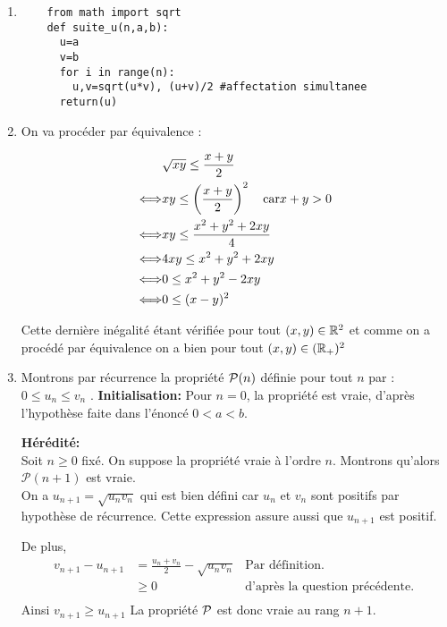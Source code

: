 \documentclass[a4paper, 11pt]{article}
\begin{document}
\begin{correction}
\begin{enumerate}
\item 
\begin{lstlisting}
    from math import sqrt
    def suite_u(n,a,b):
      u=a
      v=b
      for i in range(n):
        u,v=sqrt(u*v), (u+v)/2 #affectation simultanee
      return(u)    
\end{lstlisting}
\item On va procéder par équivalence : 

\begin{align*}
    &\sqrt{xy} \leq \frac{x+y}{2}\\
    \Longleftrightarrow & xy \leq \left(  \frac{x+y}{2}\right)^2 \quad \text{car} x+y>0\\
    \Longleftrightarrow & xy \leq \frac{x^2+y^2+2xy}{4}\\
    \Longleftrightarrow & 4xy \leq x^2+y^2+2xy\\
    \Longleftrightarrow & 0\leq x^2+y^2-2xy\\
    \Longleftrightarrow & 0\leq (x-y)^2
\end{align*}

Cette dernière inégalité étant vérifiée pour tout $(x,y)\in \mathbb{R}^2$ et comme on a procédé par équivalence on a bien 
pour tout $(x,y)\in (\mathbb{R}_+)^2$ 

\item Montrons par récurrence la propriété $\mathcal{P}(n)$ définie pour tout $n$ par : \og $  0\leq u_n\leq v_n$ \fg. 
\textbf{Initialisation:}  Pour $n=0$, la propriété est vraie, d'après l'hypothèse faite dans l'énoncé  $0<a<b.$ 

 \textbf{H\'er\'edit\'e:}\\
Soit $n\geq 0$ fix\'e. On suppose la propri\'et\'e vraie \`a l'ordre $n$. Montrons qu'alors $\mathcal{P}(n+1)$ est vraie.\\
On a $u_{n+1} = \sqrt{u_n v_n}$ qui est bien défini car $u_n $ et $v_n$ sont positifs par hypothèse de récurrence. Cette expression assure aussi que $u_{n+1}$ est positif. 

De plus, 
\begin{align*}
v_{n+1}-u_{n+1} &= \frac{u_n +v_n}{2} - \sqrt{u_n v_n}&  \text{Par définition. }\\
                &\geq 0 &  \text{d'après la question précédente. }\\
\end{align*} 
Ainsi $v_{n+1} \geq  u_{n+1}$
La propriété $\mathcal{P}$ est donc vraie au rang $n+1$.


\end{enumerate}
\end{correction}
\end{document}

